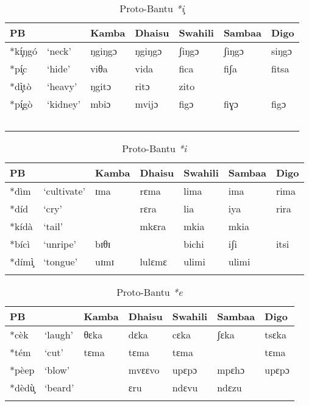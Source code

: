 \documentclass[output=paper,colorlinks,citecolor=brown]{langscibook}
\begin{document}
\begin{table}
    \caption{Proto-Bantu \textit{*i}̧}
    \label{tab:ngonyani:6}
    \begin{tabular}{l@{ }l *5{l}}
    \lsptoprule
        PB & & Kamba & Dhaisu & Swahili & Sambaa & Digo \\
        \midrule
        *kí̧ŋgó & `neck' & ŋgiŋgɔ & ŋgiŋgɔ  & ʃiŋgɔ & ʃiŋgɔ & siŋgɔ\\
        *pí̧c & `hide' & viθa & vida & fica & fiʃa & fitsa\\
        *dì̧tò & `heavy' & ŋgitɔ & ritɔ & zito &  & \\
        *pí̧gò & `kidney' & mbiɔ & mvijɔ & figɔ & fiɣɔ & figɔ \\
    \lspbottomrule\
    \end{tabular}
\end{table}
\begin{table}
    \caption{Proto-Bantu \textit{*i}}
    \label{tab:ngonyani:7}
    \begin{tabular}{l@{ }l *5{l}}
    \lsptoprule
        PB & & Kamba & Dhaisu & Swahili & Sambaa & Digo \\
        \midrule
        *dìm & `cultivate' & ɪma & rɛma  & lima & ima & rima\\ 
        *díd & `cry' &  & rɛra & lia & iya & rira\\
        *kídà & `tail' & & mkɛra & mkia & mkia & \\
        *bícì & `unripe' & bɪθɪ & & bichi & iʃi & itsi \\
        *dímì̧     & `tongue' & uɪmɪ & lulɛmɛ & ulimi & ulimi & \\
    \lspbottomrule
    \end{tabular}
\end{table}

\begin{table}
    \caption{Proto-Bantu \textit{*e}}
    \label{tab:ngonyani:8}
    \begin{tabular}{l@{ }l *5{l}}
    \lsptoprule
        PB & & Kamba & Dhaisu & Swahili & Sambaa & Digo \\
        \midrule
        *cèk & `laugh' & θɛka & dɛka  & cɛka &  ʃɛka & tsɛka \\
        *tém & `cut' & tɛma & tɛma & tɛma & & tɛma\\
        *pèep & `blow' &  & mvɛɛvo & upɛpɔ & mpɛhɔ & upɛpɔ \\
        *dèdù̧ & `beard' &  & ɛru & ndɛvu & ndɛzu & \\
    \lspbottomrule
    \end{tabular}
\end{table}
\end{document}
